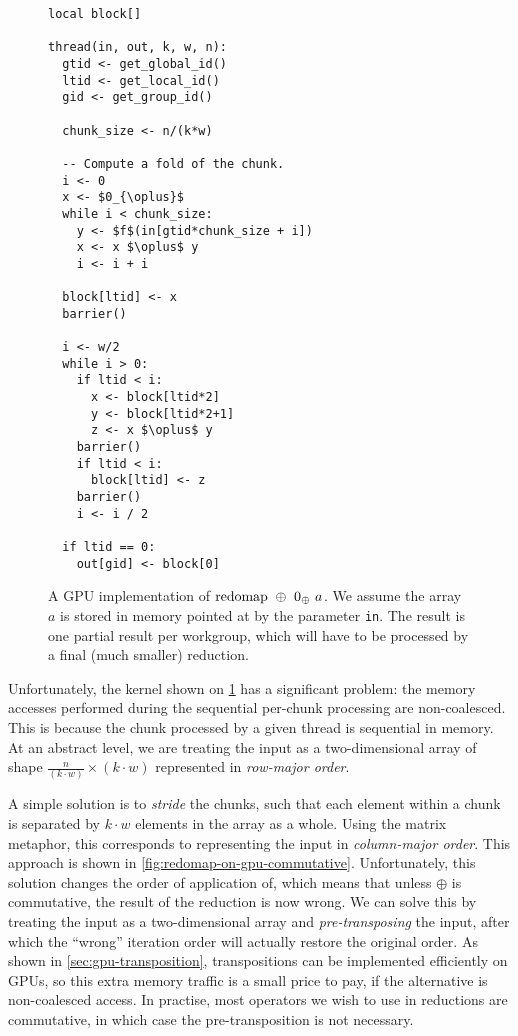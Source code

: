 \begin{figure}

\begin{lstlisting}[language={},mathescape]
local block[]

thread(in, out, k, w, n):
  gtid <- get_global_id()
  ltid <- get_local_id()
  gid <- get_group_id()

  chunk_size <- n/(k*w)

  -- Compute a fold of the chunk.
  i <- 0
  x <- $0_{\oplus}$
  while i < chunk_size:
    y <- $f$(in[gtid*chunk_size + i])
    x <- x $\oplus$ y
    i <- i + i

  block[ltid] <- x
  barrier()

  i <- w/2
  while i > 0:
    if ltid < i:
      x <- block[ltid*2]
      y <- block[ltid*2+1]
      z <- x $\oplus$ y
    barrier()
    if ltid < i:
      block[ltid] <- z
    barrier()
    i <- i / 2

  if ltid == 0:
    out[gid] <- block[0]
\end{lstlisting}

  \caption{A GPU implementation of $\mathrm{redomap}~\oplus~0_{\oplus}~a$.  We
    assume the array $a$ is stored in memory pointed at by the
    parameter \texttt{in}.  The result is one partial result per
    workgroup, which will have to be processed by a final (much
    smaller) reduction.}
  \label{fig:redomap-on-gpu}
\end{figure}

Unfortunately, the kernel shown on \cref{fig:redomap-on-gpu} has a
significant problem: the memory accesses performed during the
sequential per-chunk processing are non-coalesced.  This is because
the chunk processed by a given thread is sequential in memory.  At an
abstract level, we are treating the input as a two-dimensional array
of shape $\frac{n}{(k\cdot{}w)}\times(k\cdot{}w)$ represented in
\textit{row-major order}.

A simple solution is to \textit{stride} the chunks, such that each
element within a chunk is separated by $k\cdot{}w$ elements in the
array as a whole.  Using the matrix metaphor, this corresponds to
representing the input in \textit{column-major order}.  This approach
is shown in \cref{fig:redomap-on-gpu-commutative}.  Unfortunately,
this solution changes the order of application of, which means that
unless $\oplus$ is commutative, the result of the reduction is now
wrong.  We can solve this by treating the input as a two-dimensional
array and \textit{pre-transposing} the input, after which the
``wrong'' iteration order will actually restore the original order.
As shown in \cref{sec:gpu-transposition}, transpositions can be
implemented efficiently on GPUs, so this extra memory traffic is a
small price to pay, if the alternative is non-coalesced access.  In
practise, most operators we wish to use in reductions are commutative,
in which case the pre-transposition is not necessary.

